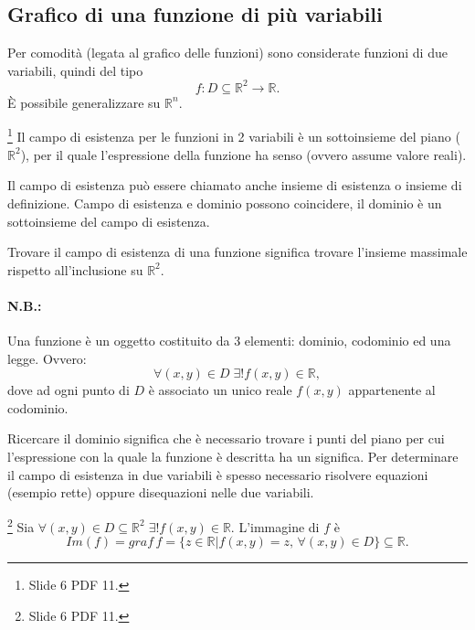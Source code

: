 \subsection{Grafico di una funzione di più variabili}\label{ssec:grafico_funzione_n_variabili}
Per comodità (legata al grafico delle funzioni) sono considerate funzioni di due variabili, quindi del tipo
\begin{equation*}
	f : D\subseteq\mathbb R^2\rightarrow\mathbb R.
\end{equation*}
È possibile generalizzare su $\mathbb R^n$.

\begin{definition}\footnote{Slide 6 PDF 11.}
    Il campo di esistenza per le funzioni in 2 variabili è un sottoinsieme del piano ($\mathbb R^2$), per il quale l'espressione della funzione ha senso (ovvero assume valore reali).
\end{definition}

Il campo di esistenza può essere chiamato anche insieme di esistenza o insieme di definizione. Campo di esistenza e dominio possono coincidere, il dominio è un sottoinsieme del campo di esistenza.

\begin{remark}
    Trovare il campo di esistenza di una funzione significa trovare l'insieme massimale rispetto all'inclusione su $\mathbb R^2$.
\end{remark}

\paragraph{N.B.:} Una funzione è un oggetto costituito da 3 elementi: dominio, codominio ed una legge. Ovvero:
\begin{equation*}
    \forall(x,y)\in D\;\exists!f(x,y)\in\mathbb R,
\end{equation*}
dove ad ogni punto di $D$ è associato un unico reale $f(x,y)$ appartenente al codominio.

Ricercare il dominio significa che è necessario trovare i punti del piano per cui l'espressione con la quale la funzione è descritta ha un significa. Per determinare il campo di esistenza in due variabili è spesso necessario risolvere equazioni (esempio rette) oppure disequazioni nelle due variabili.

\begin{definition}[Immagine di $f$]\footnote{Slide 6 PDF 11.}
    Sia $\forall(x,y)\in D\subseteq\mathbb R^2\;\exists!f(x,y)\in\mathbb R$. L'immagine di $f$ è
    \begin{equation*}
        Im(f)=graf\, f=\{z\in\mathbb R| f(x,y)=z,\,\forall(x,y)\in D\}\subseteq\mathbb R.
    \end{equation*}
\end{definition}

